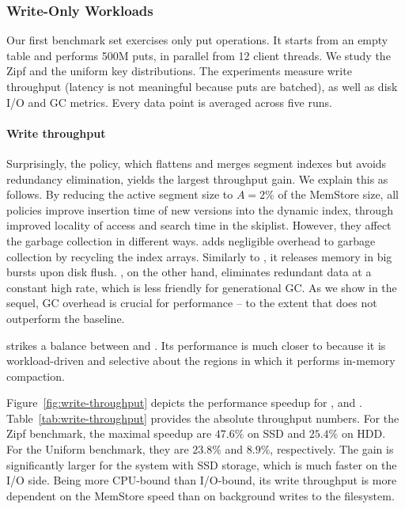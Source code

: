 \subsubsection{Write-Only Workloads}

Our first benchmark set exercises only put operations. It starts from an empty table and performs 500M puts, 
in parallel from 12 client threads. We study the Zipf and the uniform key distributions. The experiments measure
write throughput (latency is not meaningful because puts are batched), as well as disk I/O and GC metrics. 
Every data point is averaged across five runs. 

\paragraph{Write throughput} Surprisingly, the \basic\/ policy, which flattens and merges segment indexes but avoids 
redundancy elimination, yields the largest throughput gain. We explain this as follows. By reducing the active 
segment size to $A=2$\% of the MemStore size, all \sys\/ policies improve insertion time of new versions 
into the dynamic index, through improved locality of access and search time in the skiplist. However, 
they affect the garbage collection in different ways. \basic\/ adds negligible overhead to 
garbage collection by recycling the index arrays. Similarly to \none, it releases memory in big bursts
upon disk flush. \eager, on the other hand, eliminates redundant data at a constant high rate,
which is less friendly for generational GC. As we show in the sequel, GC overhead is crucial for 
performance -- to the extent that \eager\/ does not outperform the baseline. 

\adp\/ strikes a balance between \basic\/ and \eager. Its performance is much closer to \basic\/ 
because it is workload-driven and selective about the regions in which it performs in-memory compaction.  

Figure~\ref{fig:write-throughput} depicts the performance speedup for
\none, \basic\/ and \adp. Table~\ref{tab:write-throughput} provides the absolute throughput numbers. 
For the Zipf benchmark, the maximal speedup are $47.6\%$ on SSD and $25.4\%$ on HDD. For the Uniform benchmark, 
they are $23.8\%$ and $8.9\%$, respectively. The gain is significantly larger for the system with SSD storage, 
which is much faster on the I/O side. Being more CPU-bound than I/O-bound, its write throughput is more dependent on 
the MemStore speed than on background writes to the filesystem. 


